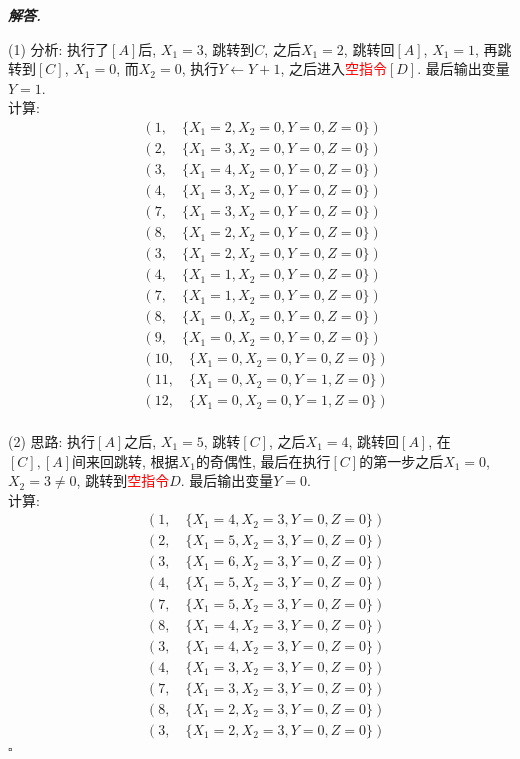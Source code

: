 \documentclass[10pt, a4paper, oneside]{ctexart}
\newenvironment{solution}{%
  \par\noindent\textbf{\textit{解答. }}\ignorespaces
}{%
  \hfill\ensuremath{\square}\par
}
\begin{document}
\begin{solution}
(1) 分析: 执行了$[A]$后, $X_1=3$, 跳转到$C$, 之后$X_1=2$, 跳转回$[A]$, $X_1=1$, 再跳转到$[C]$, $X_1=0$, 而$X_2=0$, 执行$Y\leftarrow Y+1$, 之后进入\textcolor{red}{空指令}$[D]$. 最后输出变量$Y=1$.\\
计算: 
\begin{align*}
&(1,\quad\{X_1=2,X_2=0,Y=0,Z=0\})\\
&(2,\quad\{X_1=3,X_2=0,Y=0,Z=0\})\\
&(3,\quad\{X_1=4,X_2=0,Y=0,Z=0\})\\
&(4,\quad\{X_1=3,X_2=0,Y=0,Z=0\})\\
&(7,\quad\{X_1=3,X_2=0,Y=0,Z=0\})\\
&(8,\quad\{X_1=2,X_2=0,Y=0,Z=0\})\\
&(3,\quad\{X_1=2,X_2=0,Y=0,Z=0\})\\
&(4,\quad\{X_1=1,X_2=0,Y=0,Z=0\})\\
&(7,\quad\{X_1=1,X_2=0,Y=0,Z=0\})\\
&(8,\quad\{X_1=0,X_2=0,Y=0,Z=0\})\\
&(9,\quad\{X_1=0,X_2=0,Y=0,Z=0\})\\
&(10,\quad\{X_1=0,X_2=0,Y=0,Z=0\})\\
&(11,\quad\{X_1=0,X_2=0,Y=1,Z=0\})\\
&(12,\quad\{X_1=0,X_2=0,Y=1,Z=0\})
\end{align*}
\\(2) 思路: 执行$[A]$之后, $X_1=5$, 跳转$[C]$, 之后$X_1=4$, 跳转回$[A]$, 在$[C],[A]$间来回跳转, 根据$X_1$的奇偶性, 最后在执行$[C]$的第一步之后$X_1=0$, $X_2=3\neq 0$, 跳转到\textcolor{red}{空指令}$D$. 最后输出变量$Y=0$.\\
计算: 
\begin{align*}
&(1, \quad \{X_1=4,X_2=3,Y=0,Z=0\})\\
&(2, \quad \{X_1=5,X_2=3,Y=0,Z=0\})\\
&(3, \quad \{X_1=6,X_2=3,Y=0,Z=0\})\\
&(4, \quad \{X_1=5,X_2=3,Y=0,Z=0\})\\
&(7, \quad \{X_1=5,X_2=3,Y=0,Z=0\})\\
&(8, \quad \{X_1=4,X_2=3,Y=0,Z=0\})\\
&(3, \quad \{X_1=4,X_2=3,Y=0,Z=0\})\\
&(4, \quad \{X_1=3,X_2=3,Y=0,Z=0\})\\
&(7, \quad \{X_1=3,X_2=3,Y=0,Z=0\})\\
&(8, \quad \{X_1=2,X_2=3,Y=0,Z=0\})\\
&(3, \quad \{X_1=2,X_2=3,Y=0,Z=0\})\\

\end{align*}
\end{solution}
\end{document}
